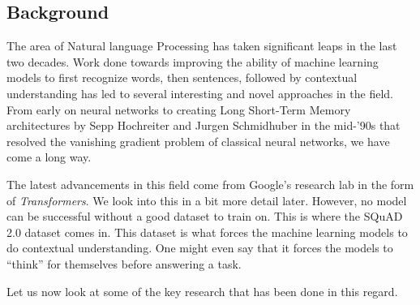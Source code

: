 \documentclass[11pt]{article}
\begin{document}
    \subsection{Background}\label{back}

	The area of Natural language Processing has taken significant leaps in the last two decades. Work done towards improving the ability of machine learning models to first recognize words, then sentences, followed by contextual understanding has led to several interesting and novel approaches in the field. From early on neural networks to creating Long Short-Term Memory architectures \citep{originallstm} by Sepp Hochreiter and Jurgen Schmidhuber in the mid-'90s that resolved the vanishing gradient problem of classical neural networks, we have come a long way.

	The latest advancements in this field come from Google's research lab in the form of \textit{Transformers}. We look into this in a bit more detail later. However, no model can be successful without a good dataset to train on. This is where the SQuAD 2.0 dataset \citep{dataset} comes in. This dataset is what forces the machine learning models to do contextual understanding. One might even say that it forces the models to ``think'' for themselves before answering a task.

    Let us now look at some of the key research that has been done in this regard.
\end{document}
